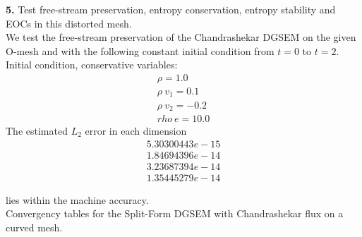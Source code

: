 \documentclass[11pt]{scrartcl}
\begin{document}
\textbf{5.} Test free-stream preservation, entropy conservation, entropy stability and EOCs in this distorted mesh. \\

We test the free-stream preservation of the Chandrashekar DGSEM on the given O-mesh and with the following constant initial condition from $t=0$ to $t=2$.\\
Initial condition, conservative variables:
\begin{align*}
\rho = 1.0 \\
  \rho \ v_1 = 0.1 \\
  \rho \ v_2 = -0.2 \\
  rho \ e = 10.0
\end{align*}
The estimated $L_2$ error in each dimension
\begin{align*}
5.30300443e-15 \\ 1.84694396e-14\\ 3.23687394e-14 \\ 1.35445279e-14
\end{align*}

lies within the machine accuracy.\\

Convergency tables for the Split-Form DGSEM with Chandrashekar flux on a curved mesh.
\end{document}
